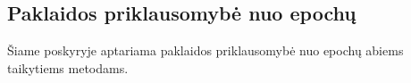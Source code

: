 \subsection{Paklaidos priklausomybė nuo epochų}
\label{subsec:paklaidos_priklausomybe_nuo_epochu}

Šiame poskyryje aptariama paklaidos priklausomybė nuo epochų abiems taikytiems metodams.


